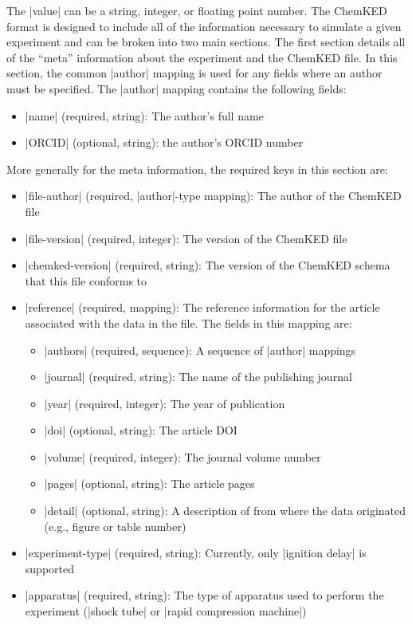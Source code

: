 \documentclass[12pt]{ijck}
\newcommand\ck{ChemKED}
\begin{document}
The \yabox|value| can be a string, integer, or floating point number. The \ck{}
format is designed to include all of the information necessary to simulate a
given experiment and can be broken into two main sections. The first section
details all of the ``meta'' information about the experiment and the \ck{} file.
In this section, the common \yabox|author| mapping is used for any fields where
an author must be specified. The \yabox|author| mapping contains the following
fields:
%
\begin{itemize}
    \item \yabox|name| (required, string): The author's full name
    \item \yabox|ORCID| (optional, string): the author's ORCID number
\end{itemize}
%
More generally for the meta information, the required keys in this section
are:
%
\begin{itemize}
    \item \yabox|file-author| (required, \yabox|author|-type mapping): The
    author of the \ck{} file
    \item \yabox|file-version| (required, integer): The version of the \ck{}
    file
    \item \yabox|chemked-version| (required, string): The version of the \ck{}
    schema that this file conforms to
    \item \yabox|reference| (required, mapping): The reference information for
    the article associated with the data in the file. The fields in this
    mapping are:
    \begin{itemize}
        \item \yabox|authors| (required, sequence): A sequence of \yabox|author|
        mappings
        \item \yabox|journal| (required, string): The name of the publishing
        journal
        \item \yabox|year| (required, integer): The year of publication
        \item \yabox|doi| (optional, string): The article DOI
        \item \yabox|volume| (required, integer): The journal volume number
        \item \yabox|pages| (optional, string): The article pages
        \item \yabox|detail| (optional, string): A description of from where the
        data originated (e.g., figure or table number)
    \end{itemize}
    \item \yabox|experiment-type| (required, string): Currently, only
    \yabox|ignition delay| is supported
    \item \yabox|apparatus| (required, string): The type of apparatus used to
    perform the experiment (\yabox|shock tube| or \yabox|rapid compression machine|)
\end{itemize}
\end{document}
